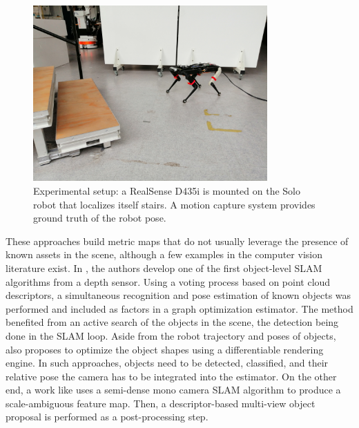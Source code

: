 \begin{figure}[h]
  \centering
  \includegraphics[width=0.80\textwidth]{figures/cosyslam/solo_closer_small.png}
  \caption{Experimental setup: a RealSense D435i is mounted on the Solo robot that localizes itself \wrt stairs. A motion capture system provides ground 
            truth of the robot pose.}
  \label{fig:solo_and_stairs}
\end{figure}

These approaches build metric maps that do not usually leverage the presence of known assets in the scene, although a few examples in the computer vision literature 
exist. In \cite{SalasMoreno2013SLAMSL}, the authors develop one of the first object-level SLAM algorithms from a depth sensor. Using a voting process based on point cloud descriptors, 
a simultaneous recognition and pose estimation of known objects was performed and included as factors in a graph optimization estimator. 
The method benefited from an active search of the objects in the scene, the detection being done in the SLAM loop.
Aside from the robot trajectory and poses of objects, \cite{sucar2020nodeslam} also proposes to optimize the object shapes using a differentiable 
rendering engine. In such approaches, objects need to be detected, classified, and their relative pose \wrt the camera has to be integrated into the estimator. 
On the other end, a work like \cite{pillai2015monocular} uses a semi-dense mono camera SLAM algorithm to produce a scale-ambiguous feature map. 
Then, a descriptor-based multi-view object proposal is performed as a post-processing step. 



